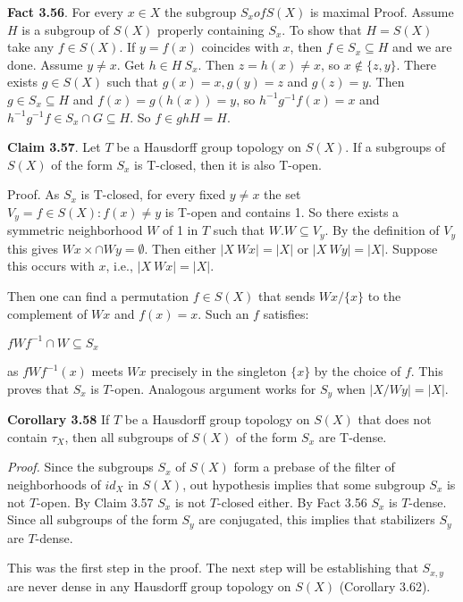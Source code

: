 \documentclass[12pt]{article}
\begin{document}
    \textbf{Fact 3.56}. For every $x \in X$ the subgroup $S_x of S(X)$ is maximal
        Proof. Assume $H$ is a subgroup of $S(X)$ properly containing $S_x$. To show that $H = S(X)$ take any $f \in S(X)$.
    If $y = f(x)$ coincides with $x$, then $f \in S_x \subseteq H$ and we are done. Assume $y \neq x$. Get $h \in H \ S_x$. Then
    $z = h(x) \neq x$, so $x \notin \{z, y\}$. There exists $g \in S(X)$ such that $g(x) = x, g(y) = z$ and $g(z) = y$. Then
    $g \in S_x \subseteq H$ and $f(x) = g(h(x)) = y$, so $h^{-1} g^{-1}f(x) = x$ and $h^{-1} g^{-1}f \in S_x \cap G \subseteq H$. So $f \in ghH = H$.


    \textbf{Claim 3.57}. Let $T$ be a Hausdorff group topology on $S(X)$. If a subgroups of $S(X)$ of the form $S_x$ is T-closed,
    then it is also T-open.


        Proof. As $S_x$ is T-closed, for every fixed $y \neq x$ the set $V_y = {f \in S(X) : f(x) \neq y}$ is T-open and contains 1.
    So there exists a symmetric neighborhood $W$ of 1 in $T$ such that $W.W \subseteq V_y$. By the definition of $V_y$ this gives
    $W x \times \cap W y = \emptyset$. Then either $|X \ Wx| = |X|$ or $|X \ W y| = |X|$. Suppose this occurs with $x$, i.e., $|X \ W x| = |X|$.


        Then one can find a permutation $f \in S(X)$ that sends $W x / \{x\}$ to the complement of $W x$ and $f(x) = x$. Such
    an $f$ satisfies:


        $fW f^{-1} \cap W \subseteq S_x$


        as $fW f^{-1}(x)$ meets $W x$ precisely in the singleton $\{x\}$ by the choice of $f$. This proves that $S_x$ is $T$-open.
    Analogous argument works for $S_y$ when $|X/W y| = |X|$.


    \textbf{Corollary 3.58} If $T$ be a Hausdorff group topology on $S(X)$ that does not contain $\tau_X$, then all subgroups of
    $S(X)$ of the form $S_x$ are T-dense.


        \emph{Proof.} Since the subgroups $S_x$ of $S(X)$ form a prebase of the filter of neighborhoods of $id_X$ in $S(X)$, out
    hypothesis implies that some subgroup $S_x$ is not $T$-open. By Claim 3.57 $S_x$ is not $T$-closed either. By Fact
    3.56 $S_x$ is $T$-dense. Since all subgroups of the form $S_y$ are conjugated, this implies that stabilizers $S_y$ are
    $T$-dense.


        This was the first step in the proof. The next step will be establishing that $S_{x,y}$ are never dense in any
    Hausdorff group topology on $S(X)$ (Corollary 3.62).
\end{document}
